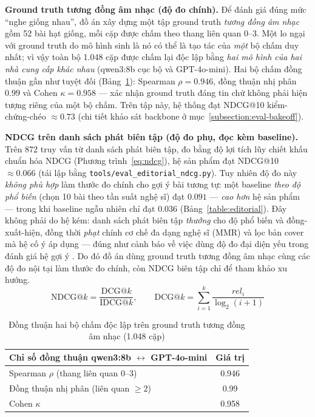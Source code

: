 \documentclass[../DoAn.tex]{subfiles}
\begin{document}
\textbf{Ground truth tương đồng âm nhạc (độ đo chính).} Để đánh giá đúng mức ``nghe giống nhau'', đồ án xây dựng một tập ground truth \textit{tương đồng âm nhạc} gồm 52 bài hạt giống, mỗi cặp được chấm theo thang liên quan $0$--$3$. Một lo ngại với ground truth do mô hình sinh là nó có thể là tạo tác của \textit{một} bộ chấm duy nhất; vì vậy toàn bộ 1.048 cặp được chấm lại độc lập bằng \textit{hai mô hình của hai nhà cung cấp khác nhau} (qwen3:8b cục bộ và GPT-4o-mini). Hai bộ chấm đồng thuận gần như tuyệt đối (Bảng~\ref{table:multijudge}): Spearman $\rho = 0.946$, đồng thuận nhị phân $0.99$ và Cohen $\kappa = 0.958$ --- xác nhận ground truth đáng tin chứ không phải hiện tượng riêng của một bộ chấm. Trên tập này, hệ thống đạt NDCG@10 kiểm-chứng-chéo $\approx 0.73$ (chi tiết khảo sát backbone ở mục~\ref{subsection:eval-bakeoff}).

\textbf{NDCG trên danh sách phát biên tập (độ đo phụ, đọc kèm baseline).} Trên 872 truy vấn từ danh sách phát biên tập, đo bằng độ lợi tích lũy chiết khấu chuẩn hóa NDCG \cite{jarvelin2002ndcg} (Phương trình~\eqref{eq:ndcg}), hệ sản phẩm đạt NDCG@10 $\approx 0.066$ (tái lập bằng \texttt{tools/eval\_editorial\_ndcg.py}). Tuy nhiên độ đo này \textit{không phù hợp} làm thước đo chính cho gợi ý bài tương tự: một baseline \textit{theo độ phổ biến} (chọn 10 bài theo tần suất nghệ sĩ) đạt $0.091$ --- \textit{cao hơn} hệ sản phẩm --- trong khi baseline ngẫu nhiên chỉ đạt $0.036$ (Bảng~\ref{table:editorial}). Đây không phải do hệ kém: danh sách phát biên tập \textit{thưởng} cho độ phổ biến và đồng-xuất-hiện, đồng thời \textit{phạt} chính cơ chế đa dạng nghệ sĩ (MMR) và lọc bản cover mà hệ cố ý áp dụng --- đúng như cảnh báo về việc dùng độ đo đại diện yếu trong đánh giá hệ gợi ý \cite{dacrema2019progress}. Do đó đồ án dùng ground truth tương đồng âm nhạc cùng các độ đo nội tại làm thước đo chính, còn NDCG biên tập chỉ để tham khảo xu hướng.
\begin{equation}\label{eq:ndcg}
    \text{NDCG@}k = \frac{\text{DCG@}k}{\text{IDCG@}k}, \qquad
    \text{DCG@}k = \sum_{i=1}^{k} \frac{rel_i}{\log_2(i+1)}
\end{equation}

\begin{table}[h!]
\centering
\caption{Đồng thuận hai bộ chấm độc lập trên ground truth tương đồng âm nhạc (1.048 cặp)}
\label{table:multijudge}
\begin{tabular}{p{8.0cm} c}
\toprule
\textbf{Chỉ số đồng thuận qwen3:8b $\leftrightarrow$ GPT-4o-mini} & \textbf{Giá trị} \\
\midrule
Spearman $\rho$ (thang liên quan $0$--$3$) & 0.946 \\
Đồng thuận nhị phân (liên quan $\geq 2$) & 0.99 \\
Cohen $\kappa$ & 0.958 \\
\bottomrule
\end{tabular}
\end{table}
\end{document}
